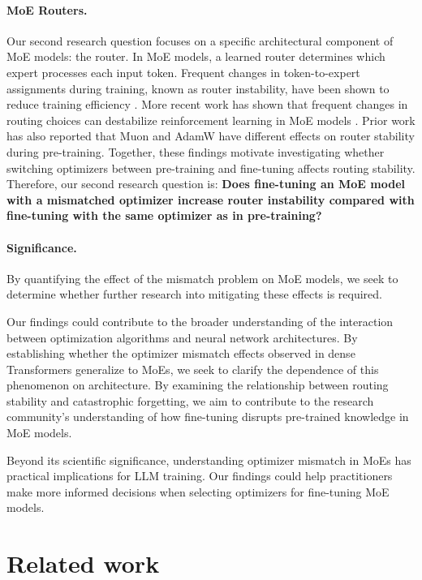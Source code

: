 \documentclass[11pt,a4paper]{article}
\begin{document}
\paragraph{MoE Routers.} Our second research question focuses on a specific architectural component of MoE models: the router. In MoE models, a learned router determines which expert processes each input token. 
Frequent changes in token-to-expert assignments during training, known as router instability, have been shown to reduce training efficiency \cite{dai2022stablemoestableroutingstrategy}. More recent work has shown that frequent changes in routing choices can destabilize reinforcement learning in MoE models \cite{zhang2026stableeffectivereinforcementlearning}. Prior work \cite{qiu2026designqwen38nextarchitectureevaluation} has also reported that Muon and AdamW have different effects on  router stability during pre-training. Together, these findings motivate investigating whether switching optimizers between pre-training and fine-tuning affects routing stability.
Therefore, our second research question is: \textbf{Does fine-tuning an MoE model with a mismatched optimizer increase router instability compared with fine-tuning with the same optimizer as in pre-training?}

\paragraph{Significance.}
By quantifying the effect of the mismatch problem on MoE models, we seek to determine whether further research into mitigating these effects is required.

Our findings could contribute to the broader understanding of the interaction between optimization algorithms and neural network architectures. By establishing whether the optimizer mismatch effects observed in dense Transformers generalize to MoEs, we seek to clarify the dependence of this phenomenon on architecture. By examining the relationship between routing stability and catastrophic forgetting, we aim to contribute to the research community's understanding of how fine-tuning disrupts pre-trained knowledge in MoE models. 

Beyond its scientific significance, understanding optimizer mismatch in MoEs has practical implications for LLM training. Our findings could help practitioners make more informed decisions when selecting optimizers for fine-tuning MoE models.

\section{Related work}
\label{sec:related}
\end{document}

